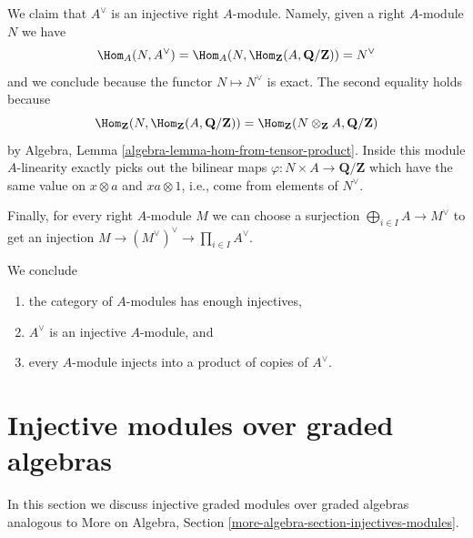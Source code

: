 \medskip\noindent
We claim that $A^\vee$ is an injective right $A$-module. Namely, given
a right $A$-module $N$ we have
$$
\Hom_A(N, A^\vee) =
\Hom_A(N, \Hom_\mathbf{Z}(A, \mathbf{Q}/\mathbf{Z})) = N^\vee
$$
and we conclude because the functor $N \mapsto N^\vee$ is exact.
The second equality holds because
$$
\Hom_\mathbf{Z}(N, \Hom_\mathbf{Z}(A, \mathbf{Q}/\mathbf{Z})) =
\Hom_\mathbf{Z}(N \otimes_\mathbf{Z} A, \mathbf{Q}/\mathbf{Z})
$$
by Algebra, Lemma \ref{algebra-lemma-hom-from-tensor-product}.
Inside this module $A$-linearity exactly picks out the bilinear maps
$\varphi : N \times A \to \mathbf{Q}/\mathbf{Z}$ which
have the same value on $x \otimes a$ and $xa \otimes 1$, i.e.,
come from elements of $N^\vee$.

\medskip\noindent
Finally, for every right $A$-module $M$ we can choose a surjection
$\bigoplus_{i \in I} A \to M^\vee$ to get an injection
$M \to (M^\vee)^\vee \to \prod_{i \in I} A^\vee$.

\medskip\noindent
We conclude
\begin{enumerate}
\item the category of $A$-modules has enough injectives,
\item $A^\vee$ is an injective $A$-module, and
\item every $A$-module injects into a product of copies of $A^\vee$.
\end{enumerate}

\section{Injective modules over graded algebras}
\label{dga-section-modules-noncommutative-graded}
In this section we discuss injective graded modules over graded algebras
analogous to
More on Algebra, Section \ref{more-algebra-section-injectives-modules}.


